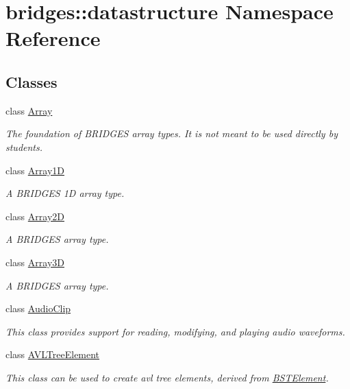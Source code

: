 \hypertarget{namespacebridges_1_1datastructure}{}\section{bridges\+:\+:datastructure Namespace Reference}
\label{namespacebridges_1_1datastructure}
\subsection*{Classes}
\begin{DoxyCompactItemize}
\item 
class \hyperlink{classbridges_1_1datastructure_1_1_array}{Array}
\begin{DoxyCompactList}\small\item\em The foundation of B\+R\+I\+D\+G\+ES array types. It is not meant to be used directly by students. \end{DoxyCompactList}\item 
class \hyperlink{classbridges_1_1datastructure_1_1_array1_d}{Array1D}
\begin{DoxyCompactList}\small\item\em A B\+R\+I\+D\+G\+ES 1D array type. \end{DoxyCompactList}\item 
class \hyperlink{classbridges_1_1datastructure_1_1_array2_d}{Array2D}
\begin{DoxyCompactList}\small\item\em A B\+R\+I\+D\+G\+ES array type. \end{DoxyCompactList}\item 
class \hyperlink{classbridges_1_1datastructure_1_1_array3_d}{Array3D}
\begin{DoxyCompactList}\small\item\em A B\+R\+I\+D\+G\+ES array type. \end{DoxyCompactList}\item 
class \hyperlink{classbridges_1_1datastructure_1_1_audio_clip}{Audio\+Clip}
\begin{DoxyCompactList}\small\item\em This class provides support for reading, modifying, and playing audio waveforms. \end{DoxyCompactList}\item 
class \hyperlink{classbridges_1_1datastructure_1_1_a_v_l_tree_element}{A\+V\+L\+Tree\+Element}
\begin{DoxyCompactList}\small\item\em This class can be used to create avl tree elements, derived from \hyperlink{classbridges_1_1datastructure_1_1_b_s_t_element}{B\+S\+T\+Element}. \end{DoxyCompactList}\item 

\end{DoxyCompactItemize}
